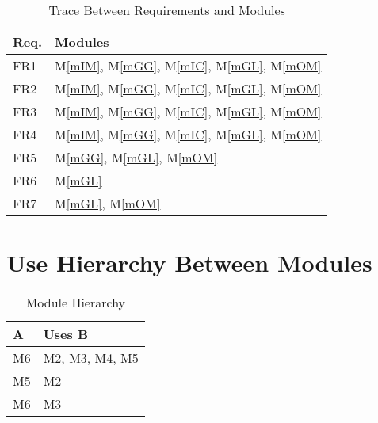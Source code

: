 \documentclass[12pt, titlepage]{article}
\newcommand{\mref}[1]{M\ref{#1}}
\begin{document}
\begin{table}[H]
\centering
\begin{tabular}{p{} p{}}
\toprule
\textbf{Req.} & \textbf{Modules}\\
\midrule
FR1 & \mref{mIM}, \mref{mGG}, \mref{mIC}, \mref{mGL}, \mref{mOM}\\
FR2 & \mref{mIM}, \mref{mGG}, \mref{mIC}, \mref{mGL}, \mref{mOM}\\
FR3 & \mref{mIM}, \mref{mGG}, \mref{mIC}, \mref{mGL}, \mref{mOM}\\
FR4 & \mref{mIM}, \mref{mGG}, \mref{mIC}, \mref{mGL}, \mref{mOM}\\
FR5 & \mref{mGG}, \mref{mGL}, \mref{mOM}\\
FR6 & \mref{mGL}\\
FR7 &  \mref{mGL}, \mref{mOM}\\
\bottomrule
\end{tabular}
\caption{Trace Between Requirements and Modules}
\label{TblRT}
\end{table}



\section{Use Hierarchy Between Modules} \label{SecUse}
\begin{table}[h!]
\centering
\begin{tabular}{p{} p{}}
\toprule
\textbf{A} & \textbf{Uses B}\\
\midrule
{M6} & {M2, M3, M4, M5}\\
\midrule
{M5} & {M2}\\
\midrule
{M6} & {M3}\\
\bottomrule
\end{tabular}
\caption{Module Hierarchy}
\label{TblMH}
\end{table}



\end{document}

